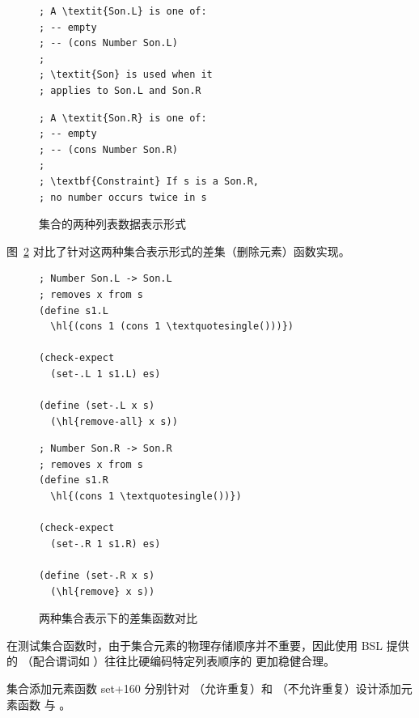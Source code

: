 \begin{figure}[htbp]
  \centering
  \begin{stepperbox}[unbreakable]
    \begin{minipage}[t]{0.48\linewidth}
\begin{Verbatim}[commandchars=\\\{\}, fontsize=\fontsize{6.0pt}{7.2pt}\selectfont]
; A \textit{Son.L} is one of:
; -- empty
; -- (cons Number Son.L)
;
; \textit{Son} is used when it
; applies to Son.L and Son.R
\end{Verbatim}
    \end{minipage}\hfill
    \begin{minipage}[t]{0.48\linewidth}
\begin{Verbatim}[commandchars=\\\{\}, fontsize=\fontsize{6.0pt}{7.2pt}\selectfont]
; A \textit{Son.R} is one of:
; -- empty
; -- (cons Number Son.R)
;
; \textbf{Constraint} If s is a Son.R,
; no number occurs twice in s
\end{Verbatim}
    \end{minipage}
  \end{stepperbox}
  \caption{集合的两种列表数据表示形式}
  \label{fig:two_representations_of_sets}
\end{figure}

图~\ref{fig:set_functions_comparison} 对比了针对这两种集合表示形式的差集（删除元素）函数实现。

\begin{figure}[htbp]
  \centering
  \begin{stepperbox}[unbreakable]
    \begin{minipage}[t]{0.48\linewidth}
\begin{Verbatim}[commandchars=\\\{\}, fontsize=\fontsize{6.0pt}{7.2pt}\selectfont]
; Number Son.L -> Son.L
; removes x from s
(define s1.L
  \hl{(cons 1 (cons 1 \textquotesingle()))})

(check-expect
  (set-.L 1 s1.L) es)

(define (set-.L x s)
  (\hl{remove-all} x s))
\end{Verbatim}
    \end{minipage}\hfill
    \begin{minipage}[t]{0.48\linewidth}
\begin{Verbatim}[commandchars=\\\{\}, fontsize=\fontsize{6.0pt}{7.2pt}\selectfont]
; Number Son.R -> Son.R
; removes x from s
(define s1.R
  \hl{(cons 1 \textquotesingle())})

(check-expect
  (set-.R 1 s1.R) es)

(define (set-.R x s)
  (\hl{remove} x s))
\end{Verbatim}
    \end{minipage}
  \end{stepperbox}
  \caption{两种集合表示下的差集函数对比}
  \label{fig:set_functions_comparison}
\end{figure}

在测试集合函数时，由于集合元素的物理存储顺序并不重要，因此使用 BSL 提供的 （配合谓词如 ）往往比硬编码特定列表顺序的  更加稳健合理。

\begin{exercise}{集合添加元素函数 set+}{160}
分别针对 （允许重复）和 （不允许重复）设计添加元素函数  与 。
\end{exercise}
